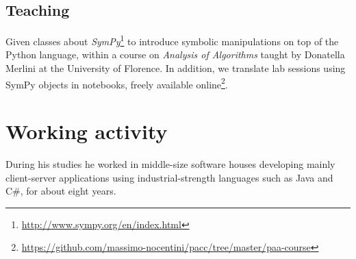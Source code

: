 \documentclass[10pt,a4paper]{scrartcl}
\begin{document}
    \subsection{Teaching}

    Given classes about
    \emph{SymPy}\footnote{\url{http://www.sympy.org/en/index.html}} to
    introduce symbolic manipulations on top of the Python language, within a
    course on \emph{Analysis of Algorithms} taught by Donatella Merlini at the
    University of Florence. In addition, we translate lab sessions using SymPy
    objects in notebooks, freely available
    online\footnote{\url{https://github.com/massimo-nocentini/pacc/tree/master/paa-course}}.

    \section{Working activity}

    During his studies he worked in middle-size software houses developing mainly client-server
    applications using industrial-strength languages such as Java and C\#, for about eight years.
        
    
\end{document}
